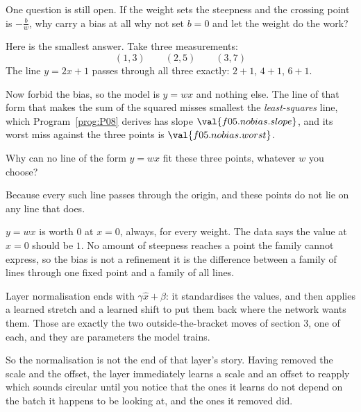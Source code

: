 \begin{fr}
One question is still open. If the weight sets the steepness and the crossing
point is $-\frac{b}{w}$, why carry a bias at all \dash{} why not set $b = 0$
and let the weight do the work?

Here is the smallest answer. Take three measurements:
\[ (1, 3) \qquad (2, 5) \qquad (3, 7) \]
The line $y = 2x + 1$ passes through all three exactly: $2 + 1$, $4 + 1$,
$6 + 1$.

Now forbid the bias, so the model is $y = wx$ and nothing else. The line of
that form that makes the sum of the squared misses smallest \dash{} the
\emph{least-squares} line, which Program~\ref{prog:P08} derives \dash{} has
slope $\val{f05.nobias.slope}$, and its worst miss against the three points is
$\val{f05.nobias.worst}$.

Why can no line of the form $y = wx$ fit these three points, whatever $w$ you
choose?
\nextframe
\end{fr}

\begin{fr}
\begin{ansblock}
Because every such line passes through the origin, and these points do not lie
on any line that does.
\end{ansblock}

$y = wx$ is worth $0$ at $x = 0$, always, for every weight. The data says the
value at $x = 0$ should be $1$. No amount of steepness reaches a point the
family cannot express, so the bias is not a refinement \dash{} it is the
difference between a family of lines through one fixed point and a family of
all lines.

\begin{aibox}
Layer normalisation ends with $\gamma \hat{x} + \beta$: it standardises the
values, and then applies a learned stretch and a learned shift to put them
back where the network wants them. Those are exactly the two outside-the-bracket
moves of section 3, one of each, and they are parameters the model trains.

So the normalisation is not the end of that layer's story. Having removed the
scale and the offset, the layer immediately learns a scale and an offset to
reapply \dash{} which sounds circular until you notice that the ones it learns
do not depend on the batch it happens to be looking at, and the ones it removed
did.
\end{aibox}
\end{fr}

